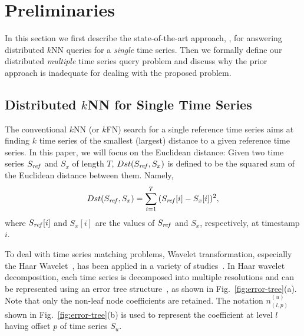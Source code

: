 \section{Preliminaries} \label{sec:prelim} 

In this section we first describe the state-of-the-art approach,
\LeeWave{}, for answering distributed $k$NN queries for a
\emph{single} time series. Then we formally define our distributed
\emph{multiple} time series query problem and discuss why the prior
approach is inadequate for dealing with the proposed problem.


\vspace{-0.1in}
\subsection{Distributed $k$NN for Single Time Series}\label{subsec:single}

The conventional $k$NN (or $k$FN) search for a single reference time
series aims at finding $k$ time series of the smallest (largest)
distance to a given reference time series. In this paper, we will
focus on the Euclidean distance: Given two time series
$\Sref$ and $S_x$ of length $T$, $Dst(\Sref,S_x)$ is defined to be
the squared sum of the Euclidean distance between them.  Namely,
{\small
\begin{equation}\label{eq:squareED} 
Dst(\Sref,S_x)=\sum_{i=1}^{T}{(\Sref[i]-S_x[i])^2},
\end{equation}
}
\noindent\hspace{-0.1in}
where $\Sref[i]$ and $S_x[i]$ are the values of $\Sref$ and $S_x$,
respectively, at timestamp $i$.

To deal with time series matching problems, Wavelet transformation,
especially the Haar Wavelet~\cite{HAA05ZUR}, has been applied in a
variety of studies~\cite{Yeh:2008:LLD,Kashyap:2011:SKS,ZHU03EFF}. In
Haar wavelet decomposition, each time series is decomposed into
multiple resolutions and can be represented using an error tree
structure~\cite{MAT98WAV}, as shown in
Fig.~\ref{fig:error-tree}(a). Note that only the non-leaf node
coefficients are retained. The notation $n_{(l,p)}^{(u)}$ shown
in Fig.~\ref{fig:error-tree}(b) is used to represent the coefficient
at level $l$ having offset $p$ of time series $S_u$.

